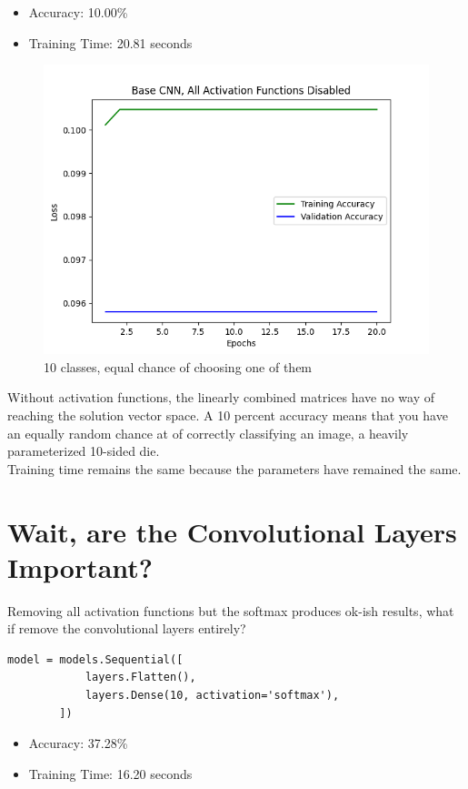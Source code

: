 \documentclass{article}
\begin{document}
    \begin{itemize}
        \item Accuracy: 10.00\%
        \item Training Time: 20.81 seconds
    \end{itemize}

    \begin{figure}[!htbp]
        \centerline{\includegraphics[width=0.55\columnwidth]{Base CNN, All Activation Functions Disabled}}
        \caption{10 classes, equal chance of choosing one of them}
        \label{fig:no-acts}
    \end{figure}

    Without activation functions, the linearly combined matrices have no way of reaching the solution vector space.
    A 10 percent accuracy means that you have an equally random chance at of correctly classifying an image, a heavily parameterized 10-sided die.
    \\
    Training time remains the same because the parameters have remained the same.


    \section{Wait, are the Convolutional Layers Important?}\label{cnn-important}

    Removing all activation functions but the softmax produces ok-ish results, what if remove the convolutional layers entirely?

    \begin{lstlisting}[label={lst:just softmax}]
        model = models.Sequential([
            layers.Flatten(),
            layers.Dense(10, activation='softmax'),
        ])
    \end{lstlisting}

    \begin{itemize}
        \item Accuracy: 37.28\%
        \item Training Time: 16.20 seconds
    \end{itemize}
\end{document}

